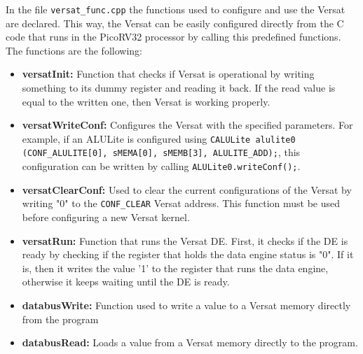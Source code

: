 In the file {\tt versat\_func.cpp} the functions used to configure and use the
Versat are declared. This way, the Versat can be easily configured directly from
the C code that runs in the PicoRV32 processor by calling this predefined
functions. The functions are the following:

\begin{itemize}
	\item \textbf{versatInit:} Function that checks if Versat is operational by writing
	something to its dummy register and reading it back. If the read value is equal to the
	written one, then Versat is working properly.
	\item \textbf{versatWriteConf:} Configures the Versat with the specified parameters. 
	For	example, if an ALULite is configured using 
	{\tt CALULite alulite0 (CONF\_ALULITE[0], sMEMA[0], sMEMB[3], ALULITE\_ADD);}, 
	this configuration can be written by calling {\tt ALULite0.writeConf();}.
	\item \textbf{versatClearConf:} Used to clear the current configurations of the 
	Versat by writing "0" to the {\tt CONF\_CLEAR} Versat address. This function must be 
	used 
	before configuring a new Versat kernel.
	\item \textbf{versatRun:} Function that runs the Versat \ac{DE}. First, it checks 
	if the \ac{DE} is ready by checking if the register that holds the data engine 
	status is "0". If it is, then it writes the value '1' to the register that runs the 
	data engine, otherwise it keeps waiting until the \ac{DE} is ready.
	\item \textbf{databusWrite:} Function used to write a value to a Versat memory 
	directly from the program
	\item \textbf{databusRead:} Loads a value from a Versat memory directly to the 
	program.
\end{itemize}

